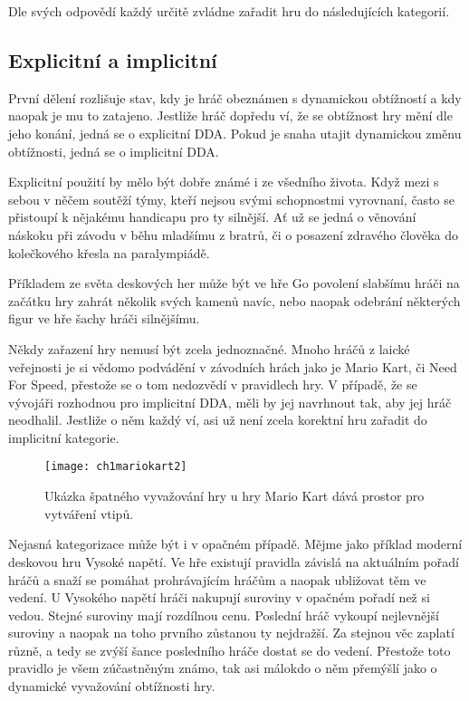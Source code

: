 Dle svých odpovědí každý určitě zvládne zařadit hru do následujících kategorií.

\subsection{Explicitní a implicitní}

První dělení rozlišuje stav, kdy je hráč obeznámen s dynamickou obtížností a kdy naopak je mu to zatajeno. Jestliže hráč dopředu ví, že se obtížnost hry mění dle jeho konání, jedná se o explicitní DDA. Pokud je snaha utajit dynamickou změnu obtížnosti, jedná se o implicitní DDA.

Explicitní použití by mělo být dobře známé i ze všedního života. Když mezi s sebou v něčem soutěží týmy, kteří nejsou svými schopnostmi vyrovnaní, často se přistoupí k nějakému handicapu pro ty silnější. Ať už se jedná o věnování náskoku při závodu v běhu mladšímu z bratrů, či o posazení zdravého člověka do kolečkového křesla na paralympiádě. 

Příkladem ze světa deskových her může být ve hře Go povolení slabšímu hráči na začátku hry zahrát několik svých kamenů navíc, nebo naopak odebrání některých figur ve hře šachy hráči silnějšímu.

Někdy zařazení hry nemusí být zcela jednoznačné. Mnoho hráčů z laické veřejnosti je si vědomo podvádění v závodních hrách jako je Mario Kart, či Need For Speed, přestože se o tom nedozvědí v pravidlech hry. V případě, že se vývojáři rozhodnou pro implicitní DDA, měli by jej navrhnout tak, aby jej hráč neodhalil. Jestliže o něm každý ví, asi už není zcela korektní hru zařadit do implicitní kategorie.

\begin{figure}
  \centering
  \texttt{[image: ch1mariokart2]}
	\caption{Ukázka špatného vyvažování hry u hry Mario Kart dává prostor pro vytváření vtipů. \cite{15UnTrue} }
	\label{ch1mariokart2}
\end{figure}

Nejasná kategorizace může být i v opačném případě. Mějme jako příklad moderní deskovou hru Vysoké napětí. Ve hře existují pravidla závislá na aktuálním pořadí hráčů a snaží se pomáhat prohrávajícím hráčům a naopak ubližovat těm ve vedení. U Vysokého napětí hráči nakupují suroviny v opačném pořadí než si vedou. Stejné suroviny mají rozdílnou cenu. Poslední hráč vykoupí nejlevnější suroviny a naopak na toho prvního zůstanou ty nejdražší. Za stejnou věc zaplatí různě, a tedy se zvýší šance posledního hráče dostat se do vedení. Přestože toto pravidlo je všem zúčastněným známo, tak asi málokdo o něm přemýšlí jako o dynamické vyvažování obtížnosti hry.

